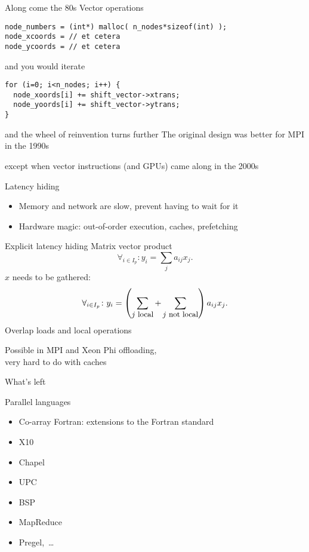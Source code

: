 \begin{numberedframe}{Along come the 80s}
Vector operations
\begin{lstlisting}
node_numbers = (int*) malloc( n_nodes*sizeof(int) );
node_xcoords = // et cetera
node_ycoords = // et cetera
\end{lstlisting}
and you would iterate
\begin{lstlisting}
for (i=0; i<n_nodes; i++) {
  node_xoords[i] += shift_vector->xtrans;
  node_yoords[i] += shift_vector->ytrans;
}
\end{lstlisting}
\end{numberedframe}

\begin{numberedframe}{and the wheel of reinvention turns further}
  The original design was better for MPI in the 1990s

  except when vector instructions (and GPUs) came along in the 2000s
\end{numberedframe}

\begin{numberedframe}{Latency hiding}
  \begin{itemize}
  \item Memory and network are slow, prevent having to wait for it
  \item Hardware magic: out-of-order execution, caches, prefetching
  \end{itemize}
\end{numberedframe}

\begin{numberedframe}{Explicit latency hiding}
Matrix vector product
\[ \forall_{i\in I_p}\colon y_i=\sum_j a_{ij}x_j. \]
$x$ needs to be gathered:
\[ \forall_{i\in I_p}\colon y_i=
  \left(\sum_{\mbox{\small $j$ local}}
    +\sum_{\mbox{\small $j$ not local}} \right) a_{ij}x_j. 
\]
Overlap loads and local operations

Possible in MPI and Xeon Phi offloading,\\
very hard to do with caches  
\end{numberedframe}

 {What's left}

\begin{numberedframe}{Parallel languages}
  \begin{itemize}
  \item Co-array Fortran: extensions to the Fortran standard
  \item X10
  \item Chapel
  \item UPC
  \item BSP
  \item MapReduce
  \item Pregel,~\ldots
  \end{itemize}
\end{numberedframe}

